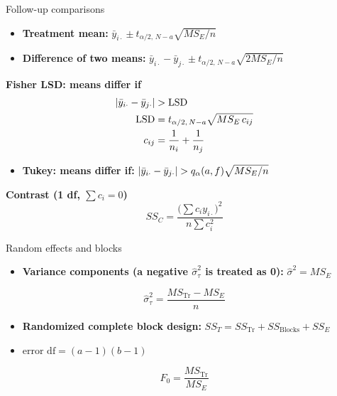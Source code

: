 \begin{formulabox}{Follow-up comparisons}
\begin{itemize}
  \item \textbf{Treatment mean:} $\bar{y}_{i\cdot}\pm t_{\alpha/2,\,N-a}\sqrt{MS_E/n}$
  \item \textbf{Difference of two means:} $\bar{y}_{i\cdot}-\bar{y}_{j\cdot}\pm t_{\alpha/2,\,N-a}\sqrt{2MS_E/n}$
\end{itemize}
\textbf{Fisher LSD: means differ if}
\[ \begin{aligned}\lvert\bar{y}_{i\cdot}-\bar{y}_{j\cdot}\rvert&>\mathrm{LSD}\\ \mathrm{LSD}&=t_{\alpha/2,\,N-a}\sqrt{MS_E\,c_{ij}}\\ c_{ij}&=\frac1{n_i}+\frac1{n_j}\end{aligned} \]
\begin{itemize}
  \item \textbf{Tukey: means differ if:} $\lvert\bar{y}_{i\cdot}-\bar{y}_{j\cdot}\rvert>q_\alpha(a,f)\sqrt{MS_E/n}$
\end{itemize}
\textbf{Contrast (1 df, $\sum c_i=0$)}
\[ SS_C=\frac{\big(\sum c_iy_{i\cdot}\big)^2}{n\sum c_i^2} \]
\end{formulabox}

\begin{formulabox}{Random effects and blocks}
\begin{itemize}
  \item \textbf{Variance components (a negative $\hat\sigma_\tau^2$ is treated as 0):} $\hat\sigma^2=MS_E$
\end{itemize}
\[ \hat\sigma_\tau^2=\frac{MS_{\text{Tr}}-MS_E}{n} \]
\begin{itemize}
  \item \textbf{Randomized complete block design:} $SS_T=SS_{\text{Tr}}+SS_{\text{Blocks}}+SS_E$
  \item $\text{error df}=(a-1)(b-1)$
\end{itemize}
\[ F_0=\frac{MS_{\text{Tr}}}{MS_E} \]
\end{formulabox}


